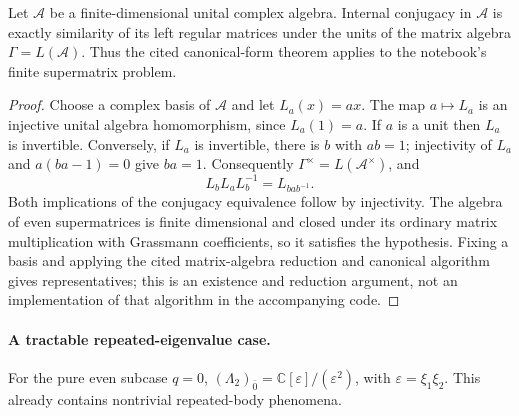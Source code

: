 \begin{proposition}
Let \(\mathcal A\) be a finite-dimensional unital complex algebra. Internal conjugacy in \(\mathcal A\) is exactly similarity of its left regular matrices under the units of the matrix algebra \(\Gamma=L(\mathcal A)\). Thus the cited canonical-form theorem applies to the notebook's finite supermatrix problem.
\end{proposition}
\begin{proof}
Choose a complex basis of \(\mathcal A\) and let \(L_a(x)=ax\). The map \(a\mapsto L_a\) is an injective unital algebra homomorphism, since \(L_a(1)=a\). If \(a\) is a unit then \(L_a\) is invertible. Conversely, if \(L_a\) is invertible, there is \(b\) with \(ab=1\); injectivity of \(L_a\) and \(a(ba-1)=0\) give \(ba=1\). Consequently \(\Gamma^\times=L(\mathcal A^\times)\), and
\[
 L_bL_aL_b^{-1}=L_{bab^{-1}}.
\]
Both implications of the conjugacy equivalence follow by injectivity. The algebra of even supermatrices is finite dimensional and closed under its ordinary matrix multiplication with Grassmann coefficients, so it satisfies the hypothesis. Fixing a basis and applying the cited matrix-algebra reduction and canonical algorithm gives representatives; this is an existence and reduction argument, not an implementation of that algorithm in the accompanying code.
\end{proof}

\paragraph{A tractable repeated-eigenvalue case.}
For the pure even subcase \(q=0\), \((\Lambda_2)_{\bar0}=\mathbb C[\varepsilon]/(\varepsilon^2)\), with \(\varepsilon=\xi_1\xi_2\). This already contains nontrivial repeated-body phenomena.

